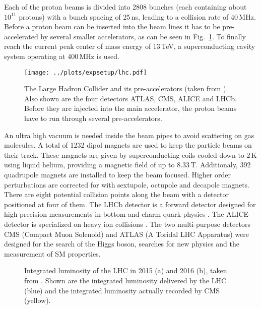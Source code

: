 \noindent Each of the proton beams is divided into 2808 bunches (each containing about $10^{11}$ protons) with a bunch spacing of 25\,ns, leading to a collision rate of 40\,MHz. Before a proton beam can be inserted into the beam lines it has to be pre-accelerated by several smaller accelerators, as can be seen in Fig.~\ref{fig:expsetup:lhc}. To finally reach the current peak center of mass energy of 13\,TeV, a superconducting cavity system operating at 400\,MHz is used.\\
\begin{figure}[t]
	\centering
	\texttt{[image: ../plots/expsetup/lhc.pdf]}
	\caption[The Large Hadron Collider]{The Large Hadron Collider and its pre-accelerators (taken from \cite{lhc_fig}). Also shown are the four detectors ATLAS, CMS, ALICE and LHCb. Before they are injected into the main accelerator, the proton beams have to run through several pre-accelerators.}
	\label{fig:expsetup:lhc}
\end{figure}

\noindent An ultra high vacuum is needed inside the beam pipes to avoid scattering on gas molecules. A total of 1232 dipol magnets are used to keep the particle beams on their track. These magnets are given by superconducting coils cooled down to 2\,K using liquid helium, providing a magnetic field of up to 8.33\,T. Additionaly, 392 quadrupole magnets are installed to keep the beam focused. Higher order perturbations are corrected for with sextupole, octupole and decapole magnets.\\

\noindent There are eight potential collision points along the beam with a detector positioned at four of them. The LHCb detector is a forward detector designed for high precision measurements in bottom and charm quark physics \cite{LHCB}. The ALICE detector is specialized on heavy ion collisions \cite{ALICE}. The two multi-purpose detectors CMS (Compact Muon Solenoid) and ATLAS (A Toridal LHC Apparatus) were designed for the search of the Higgs boson, searches for new physics and the measurement of SM properties.\\

\begin{figure}
	\centering
	\begin{minipage}{0.5\textwidth}
	\end{minipage}%
	\begin{minipage}{0.5\textwidth}
	\end{minipage}
	\caption[Integrated luminosity of the LHC in 2015 and 2016]{Integrated luminosity of the LHC in 2015 (a) and 2016 (b), taken from 	\cite{cmslumi}. Shown are the integrated luminosity delivered by the LHC (blue) and the integrated luminosity actually recorded by CMS (yellow).}
\end{figure}


